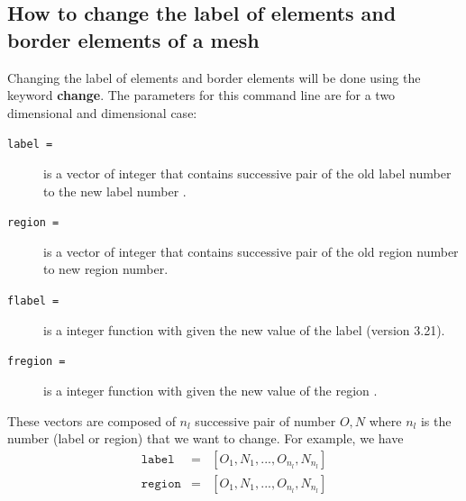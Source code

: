 \documentclass[a4paper,twoside,12pt]{book}
\begin{document}
\subsection{How to change the label of elements and border elements of a mesh}
\label{sec.changelab.gluemesh}
Changing the label of elements and border elements will be done using the keyword {\bf{change}}. The parameters for this
command line are for a two dimensional and dimensional case:
\begin{description}
\item [\texttt{label =}] is a vector of integer that contains successive pair of the old label number to  the new label number .
\item [\texttt{region =}] is a vector of integer that contains successive pair of the old region number to new region number.
\item [\texttt{flabel =}]  is a integer function with given the new value of the label (version 3.21).
\item [\texttt{fregion =}] is a integer function with given the new value of the region .
\end{description}

These vectors are composed of $n_{l}$ successive pair of number $O,N$  where $n_{l}$ is the number (label or region)
that we want to change.
For example, we have
\begin{eqnarray}
\label{eq.org.vector.change.label}
\mathtt{label} &= &[ O_{1}, N_{1},  ..., O_{n_{l}},N_{n_{l}} ] \\
\mathtt{region} & =& [ O_{1}, N_{1},  ..., O_{n_{l}},N_{n_{l}} ] 
\end{eqnarray}

\end{document}
